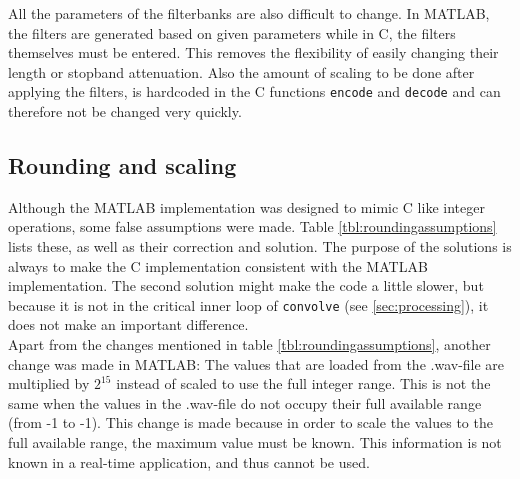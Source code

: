 \documentclass[a4paper]{article}
\begin{document}
All the parameters of the filterbanks are also difficult to change. In MATLAB, the filters are generated based on given parameters while in C, the filters themselves must be entered. This removes the flexibility of easily changing their length or stopband attenuation. Also the amount of scaling to be done after applying the filters, is hardcoded in the C functions \texttt{encode} and \texttt{decode} and can therefore not be changed very quickly.

\subsection{Rounding and scaling}\label{sec:rounding}
Although the MATLAB implementation was designed to mimic C like integer operations, some false assumptions were made. Table \ref{tbl:roundingassumptions} lists these, as well as their correction and solution. The purpose of the solutions is always to make the C implementation consistent with the MATLAB implementation. The second solution might make the code a little slower, but because it is not in the critical inner loop of \texttt{convolve} (see \ref{sec:processing}), it does not make an important difference.\\

Apart from the changes mentioned in table \ref{tbl:roundingassumptions}, another change was made in MATLAB: The values that are loaded from the .wav-file are multiplied by $2^{15}$ instead of scaled to use the full integer range. This is not the same when the values in the .wav-file do not occupy their full available range (from -1 to -1). This change is made because in order to scale the values to the full available range, the maximum value must be known. This information is not known in a real-time application, and thus cannot be used.
\begin{table}[htb]
\centering
{}
\caption{False assumptions about rounding mechanisms, with their corrections and solutions}
\label{tbl:roundingassumptions}
\end{table}
\end{document}
